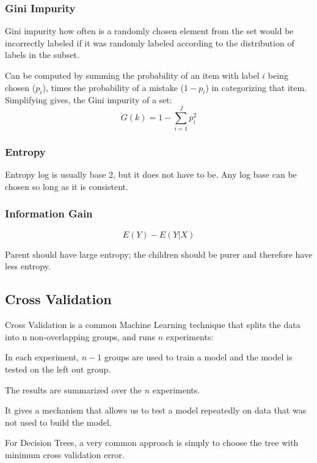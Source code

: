 	\subsubsection{Gini Impurity}
Gini impurity how often is a randomly chosen element from the set would be incorrectly labeled if it was randomly labeled according to the distribution of labels in the subset.

Can be computed by summing the probability of an item with label $i$ being chosen ($p_i$), times the probability of a mistake ($1-p_i$)
in categorizing that item.
Simplifying gives, the Gini impurity of a set:
	\begin{equation}
		G(k) = 1 - \sum_{i=1}^J p_i^2
	\end{equation}

	\subsubsection{Entropy}
Entropy log is usually base 2, but it does not have to be.  Any log base can be chosen so long as it is consistent.

	\subsubsection{Information Gain}
	\begin{equation}
		E(Y) - E(Y|X)
	\end{equation}
	\begin{mathwhere}[0.4in]
	\end{mathwhere}
Parent should have large entropy; the children should be purer and therefore have less entropy.

	\subsection{Cross Validation}
Cross Validation is a common Machine Learning technique that splits the data into n non-overlapping groups, and runs $n$ experiments:
	\begin{bulletedlist}
		\item In each experiment, $n-1$ groups are used to train a model and the model is tested on the left out group.
		\item The results are summarized over the $n$ experiments.
		\item It gives a mechanism that allows us to test a model repeatedly on data that was not used to build the model.
		\item For Decision Trees, a very common approach is simply to choose the tree with minimum cross validation error.
	\end{bulletedlist}

